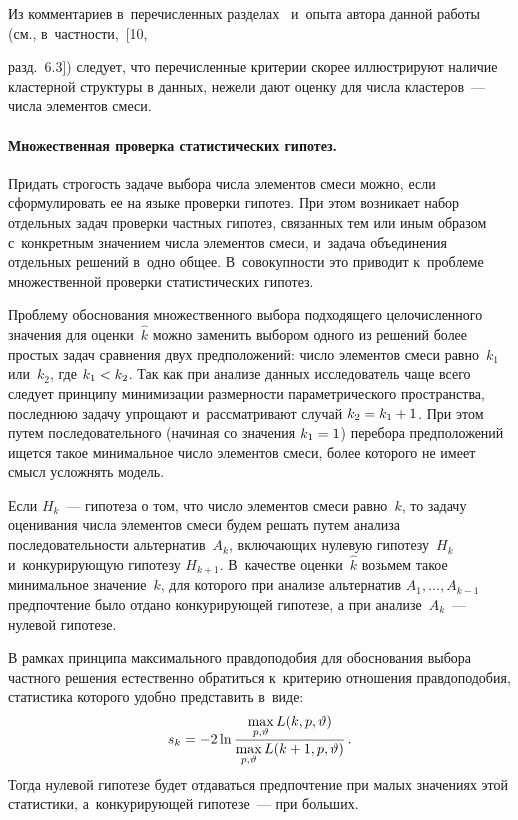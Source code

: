 \begin{multicols}{2}
     Из комментариев в~перечисленных разделах~\cite{6-kri} и~опыта автора
данной работы (см., в~частности,~[10,\linebreak\vspace*{-12pt}

\columnbreak

\noindent
 разд.~6.3]) следует, что
перечисленные критерии скорее иллюстрируют наличие кластерной структуры
в данных, нежели дают оценку для числа клас\-те\-ров~--- числа элементов смеси.

\vspace*{-6pt}

     \paragraph*{Множественная проверка статистических гипотез.}
Придать строгость задаче выбора числа элементов смеси можно, если
сформулировать ее на языке проверки гипотез. При этом возникает набор
отдельных задач проверки частных гипотез, связанных тем или иным образом с~конкретным значением числа элементов смеси, и~задача объединения
отдельных решений в~одно общее. В~совокупности это приводит к~проблеме
множественной проверки статистических гипотез.

     Проблему обоснования множественного выбора подходящего
целочисленного значения для оценки~$\hat{k}$ можно заменить выбором
одного из решений более простых задач сравнения двух предположений: число
элементов смеси равно~$k_1$ или~$k_2$, где $k_1\hm <k_2$. Так как при анализе
данных исследователь чаще всего следует принципу минимизации размерности
параметрического пространства, последнюю задачу упрощают и~рассматривают
случай $k_2\hm= k_1+1$. При этом путем последовательного (начиная со
значения $k_1\hm= 1$) перебора предположений ищется такое минимальное число
элементов смеси, более которого не имеет смысл усложнять модель.

     Если $H_k$~--- гипотеза о том, что число элементов смеси равно~$k$, то
задачу оценивания числа элементов смеси будем решать путем анализа
последовательности альтернатив~$A_k$, включающих нулевую
гипотезу~$H_k$ и~конкурирующую гипотезу $H_{k+1}$. В~качестве
оценки~$\hat{k}$ возьмем такое минимальное значение~$k$, для которого при
анализе альтернатив $A_1,\ldots, A_{k-1}$ предпочтение было отдано
конкурирующей гипотезе, а при анализе~$A_k$~--- нулевой гипотезе.

     В рамках принципа максимального правдоподобия для обоснования
выбора частного решения естественно обратиться к~критерию отношения
правдоподобия, статистика которого удобно представить в~виде:
     $$
     s_k= -2\ln \displaystyle\frac{\displaystyle \max\limits_{p,\vartheta} L(k,p,\vartheta)\mathstrut}{\displaystyle \max\limits_{p,\vartheta} L(k+1,p,\vartheta)\mathstrut}\,.
     $$
     Тогда нулевой гипотезе будет отдаваться предпочтение при малых
значениях этой статистики, а~конкурирующей гипотезе~--- при больших.


\end{multicols}
